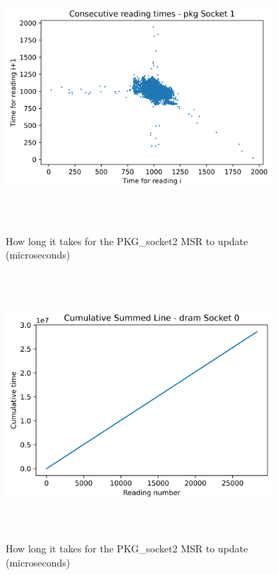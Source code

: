 \begin{figure}[H]
    \centering
    \includegraphics[width=10cm,height=10cm,keepaspectratio]{jmh/msr-update-rate/pkg_Socket_1-i_n-v-i_n1.png}
    \caption{How long it takes for the PKG\_socket2 MSR to update (microseconds)}
    \label{fig:PKG-rapl-counter}
\end{figure}

\begin{figure}[H]
    \centering
    \includegraphics[width=10cm,height=10cm,keepaspectratio]{jmh/msr-update-rate/dram_Socket_0-cumulative-summed.png}
    \caption{How long it takes for the PKG\_socket2 MSR to update (microseconds)}
    \label{fig:PKG-rapl-counter}
\end{figure}

